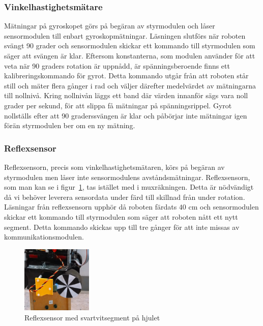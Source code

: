 \documentclass[a4paper,12pt,fleqn]{article}
\begin{document}
\subsubsection{Vinkelhastighetsmätare}
Mätningar på gyroskopet görs på begäran av styrmodulen och låser sensormodulen till enbart gyroskopmätningar. 
Läsningen slutförs när roboten svängt 90 grader och sensormodulen skickar ett kommando till styrmodulen som säger att svängen är klar. Eftersom konstanterna, som modulen använder för att veta när 90 graders rotation är uppnådd, är spänningsberoende finns ett kalibreringskommando för gyrot. Detta kommando utgår från att roboten står still och mäter flera gånger i rad och väljer därefter medelvärdet av mätningarna till nollnivå. Kring nollnivån läggs ett band där värden innanför sägs vara noll grader per sekund, för att slippa få mätningar på spänningsrippel. Gyrot nollställs efter att 90 graderssvängen är klar och påbörjar inte mätningar igen förän styrmodulen ber om en ny mätning.

\subsubsection{Reflexsensor}
Reflexsensorn, precis som vinkelhastighetsmätaren, körs på begäran av styrmodulen men låser inte sensormodulens avståndsmätningar. Reflexsensorn, som man kan se i figur~\ref{fig:reflex}, tas istället med i muxräkningen. Detta är nödvändigt då vi behöver leverera sensordata under färd till skillnad från under rotation. Läsningar från reflexsensorn upphör då roboten färdats $40$ cm och sensormodulen skickar ett kommando till styrmodulen
som säger att roboten nått ett nytt segment. Detta kommando skickas upp till tre gånger för att inte missas av kommunikationsmodulen.

\begin{figure}[htp] %
  \begin{center}
  \includegraphics[keepaspectratio=true,width=0.3\textwidth]{reflexsensor.png}  %
  \end{center}
  \caption{Reflexsensor med svartvitsegment på hjulet} %
  \label{fig:reflex}
\end{figure}
\end{document}
